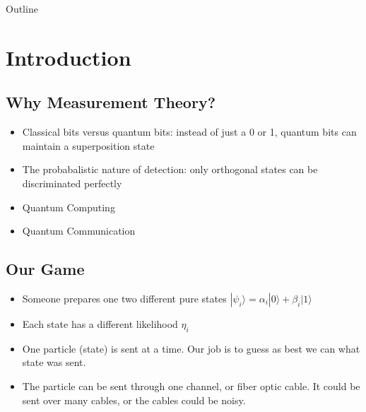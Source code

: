 \documentclass{beamer}
\subtitle
{Mixed State Discrimination: In Subspaces and Future Work}
\author[Vadim Yerokhin] %
{Vadim Yerokhin }
\date[CFP 2003] %
{Hunter College, November 18th 2013 }
\newcommand{\ke}[1]{|#1\rangle}
\begin{document}
\begin{frame}
  \titlepage
\end{frame}

\begin{frame}{Outline}
  \tableofcontents[pausesections]
\end{frame}






\section{Introduction}
\subsection{Why Measurement Theory?}
\begin{frame}
\begin{itemize}
\item
Classical bits versus quantum bits: instead of just a 0 or 1, quantum bits can maintain a superposition state
\pause
\item
The probabalistic nature of detection: only orthogonal states can be discriminated perfectly
\pause
\item
Quantum Computing
\pause
\item
Quantum Communication
\end{itemize}
\end{frame}
\subsection{Our Game}
\begin{frame}
\begin{itemize}
\item
Someone prepares one two different pure states $\ke {\psi_i} = \alpha_i \ke 0 +  \beta_i \ke 1$
\pause
\item
Each state has a different likelihood $\eta_i$
\pause
\item
One particle (state) is sent at a time.  Our job is to guess as best we can what state was sent.
\pause
\item
The particle can be sent through one channel, or fiber optic cable.  It could be sent over many cables, or the cables could be noisy.
\end{itemize}

\end{frame}
\end{document}
